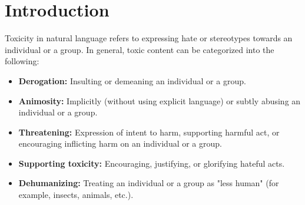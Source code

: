 \section{Introduction}

Toxicity in natural language refers to expressing hate or stereotypes towards an individual or a group.
In general, toxic content can be categorized into the following:

\begin{itemize}
  \item \textbf{Derogation:} Insulting or demeaning an individual or a group.
  \item \textbf{Animosity:} Implicitly (without using explicit language) or subtly abusing an individual or a group.
  \item \textbf{Threatening:} Expression of intent to harm, supporting harmful act, or encouraging inflicting harm on an individual or a group.
  \item \textbf{Supporting toxicity:} Encouraging, justifying, or glorifying hateful acts.
  \item \textbf{Dehumanizing:} Treating an individual or a group as "less human" (for example, insects, animals, etc.).
\end{itemize}
